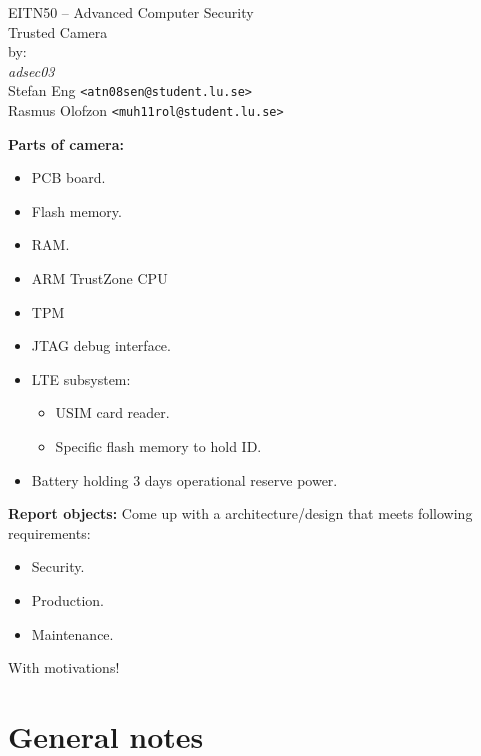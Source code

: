 \documentclass[10pt]{article}
\begin{document}

  \thispagestyle{empty}
  \vspace*{3cm}
  \begin{center}
    \huge{EITN50 -- Advanced Computer Security} \\
    \vspace{0.3cm}
    \LARGE{Trusted Camera} \\
    \vspace{1cm}
    \large{by: \\ \vspace{0.2cm}
	\textit{adsec03} \\
        Stefan Eng \texttt{<atn08sen@student.lu.se>} \\
        Rasmus Olofzon \texttt{<muh11rol@student.lu.se>}
        } \\
  \end{center}


  \newpage

  \textbf{Parts of camera:}
  \begin{itemize}
    \item{PCB board.}
    \item{Flash memory.}
    \item{RAM.}
    \item{ARM TrustZone CPU}
    \item{TPM}
    \item{JTAG debug interface.}
    \item{LTE subsystem:}
    \begin{itemize}
      \item{USIM card reader.}
      \item{Specific flash memory to hold ID.}
    \end{itemize}
    \item{Battery holding 3 days operational reserve power.}
  \end{itemize}

  \textbf{Report objects:}
  Come up with a architecture/design that meets following requirements:
  \begin{itemize}
    \item{Security.}
    \item{Production.}
    \item{Maintenance.}
  \end{itemize}
  With motivations!

  \section{General notes}
\end{document}
